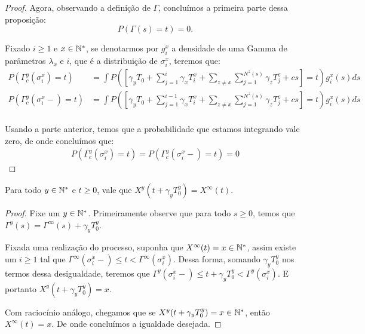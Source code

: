 \begin{proof}
  Agora, observando a definição de $\Gamma$, concluímos a primeira
  parte dessa proposição:
  \begin{displaymath}
    P\left( \Gamma(s) = t \right) = 0.
  \end{displaymath}


  Fixado $i \geq 1$ e $x \in {\mathbb{N^*}}$, se denotarmos por $g^x_i$ a
  densidade de uma Gamma de parâmetros $\lambda_x$ e $i$, que é a
  distribuição de $\sigma^x_i$, teremos que:
  \begin{align*}
    P \left( \Gamma^y_c(\sigma^x_i) = t \right) &=
    \int P\left( \left[ \gamma_y T_0 + \sum_{j = 1}^{i} \gamma_x
    T_i^x + \sum_{z \neq x} \sum_{j = 1}^{N^z(s)} \gamma_z
    T^z_j + c s\right]  = t \right)g^x_i(s) ds\\
    P \left( \Gamma^y_c(\sigma^x_i-) = t \right) &=
    \int P\left( \left[ \gamma_y T_0 + \sum_{j = 1}^{i-1} \gamma_x
    T_i^x + \sum_{z \neq x} \sum_{j = 1}^{N^z(s)} \gamma_z
    T^z_j + c s\right]  = t \right)g^x_i(s) ds\\
  \end{align*}

  Usando a parte anterior, temos que a probabilidade que estamos
  integrando vale zero, de onde concluímos que:
 \begin{align*}
    P \left( \Gamma^y_c(\sigma^x_i) = t \right) =
    P \left( \Gamma^y_c(\sigma^x_i-) = t \right) =
    0
  \end{align*}
\end{proof}


\begin{proposicao}
  \label{prop:reinicia-infinito}
  Para todo $y \in {\mathbb{N^*}}$ e $t \geq 0$, vale que
  $X^y(t + \gamma_y T_0^y) = X^\infty(t)$.
\end{proposicao}
\begin{proof}
  Fixe um $y \in {\mathbb{N^*}}$. Primeiramente observe que para todo $s \geq 0$,
  temos que $\Gamma^y(s) = \Gamma^\infty(s) + \gamma_yT^y_0$.

  Fixada uma realização do processo, suponha que $X^\infty(t) = x \in
  {\mathbb{N^*}}$, assim existe um $i \geq 1$ tal que $\Gamma^\infty(\sigma_i^x-)
  \leq t < \Gamma^\infty(\sigma_i^x)$. Dessa forma, somando $\gamma_y
  T^y_0$ nos termos dessa desigualdade, teremos que
  $\Gamma^y(\sigma_i^x-) \leq t+\gamma_yT_0^y <
  \Gamma^y(\sigma_i^x)$. E portanto $X^y(t+\gamma_y T_0^y) = x$.

  Com raciocínio análogo, chegamos que se $X^y(t+\gamma_y T_0^y) = x
  \in {\mathbb{N^*}}$, então $X^\infty(t) = x$. De onde concluímos a igualdade desejada.
\end{proof}


